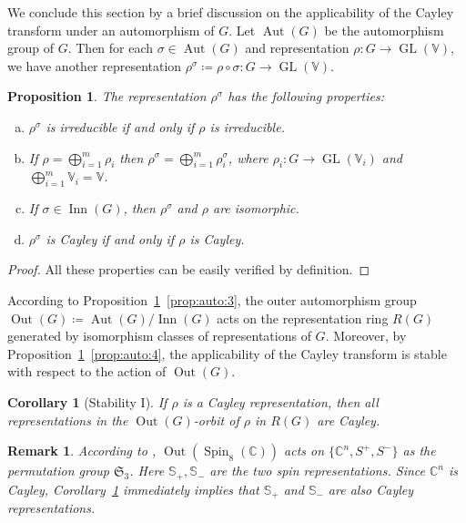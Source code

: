 \documentclass[11pt,reqno]{amsart}
\DeclareMathOperator{\GL}{GL}
\DeclareMathOperator{\Aut}{Aut}
\DeclareMathOperator{\Inn}{Inn}
\DeclareMathOperator{\Out}{Out}
\DeclareMathOperator{\Spin}{Spin}
\newtheorem{corollary}[theorem]{Corollary}
\newtheorem{proposition}[theorem]{Proposition}
\newtheorem{remark}[theorem]{Remark}
\newcommand{\CC}{\mathbb{C}} %
\begin{document}
We conclude this section by a brief discussion on the applicability of the Cayley transform under an automorphism of $G$.  Let $\Aut(G)$ be the automorphism group of $G$.  Then for each $\sigma \in \Aut(G)$ and representation $\rho: G \to \GL(\mathbb{V})$,  we have another representation $\rho^{\sigma} \coloneqq \rho \circ \sigma: G \to \GL(\mathbb{V})$.  
\begin{proposition}\label{prop:auto}
The representation $\rho^{\sigma}$ has  the following properties:
\begin{enumerate}[(a)]
\item $\rho^{\sigma}$ is irreducible if and only if $\rho$ is irreducible.  \label{prop:auto:1}
\item If $\rho = \bigoplus_{i=1}^m \rho_i$ then $\rho^{\sigma} = \bigoplus_{i=1}^m \rho_i^{\sigma}$,  where $\rho_i: G \to \GL(\mathbb{V}_i)$ and $\bigoplus_{i=1}^m \mathbb{V}_i = \mathbb{V}$. \label{prop:auto:2}
\item If $\sigma \in \Inn(G)$,  then $\rho^{\sigma}$ and $\rho$ are isomorphic. \label{prop:auto:3}
\item $\rho^{\sigma}$ is Cayley if and only if $\rho$ is Cayley.  \label{prop:auto:4}
\end{enumerate}
\end{proposition}
\begin{proof}
All these properties can be easily verified by definition.
\end{proof}
According to Proposition~\ref{prop:auto}~\eqref{prop:auto:3},  the outer automorphism group $\Out(G) \coloneqq \Aut(G)/\Inn(G)$ acts on the representation ring $R(G)$ generated by isomorphism classes of representations of $G$.  Moreover,  by Proposition~\ref{prop:auto}~\eqref{prop:auto:4},  the applicability of the Cayley transform is stable with respect to the action of $\Out(G)$.
\begin{corollary}[Stability I]\label{cor:stability-1}
If $\rho$ is a Cayley representation,  then all representations in the $\Out(G)$-orbit of $\rho$ in $R(G)$ are Cayley. 
\end{corollary}
\begin{remark}\label{rmk:spin8}
According to \cite[Section~20.3]{fulton2013representation},  $\Out(\Spin_8(\CC))$ acts on $\{\mathbb{C}^n,   S^+, S^-\}$ as the permutation group $\mathfrak{S}_3$.  Here $\mathbb{S}_+, \mathbb{S}_-$ are the two spin representations.  Since $\mathbb{C}^n$ is Cayley,  Corollary~\ref{cor:stability-1} immediately implies that $\mathbb{S}_+$ and $\mathbb{S}_-$ are also Cayley representations. 
\end{remark}
\end{document}
